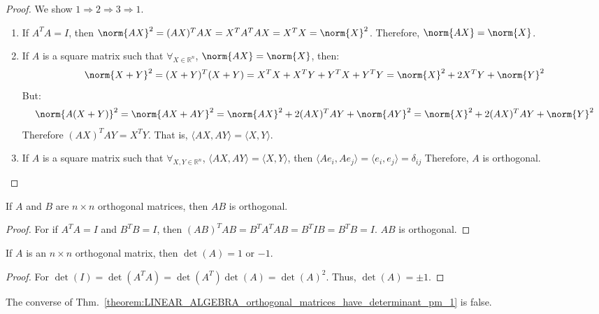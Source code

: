 \documentclass[crop=false,class=book,oneside]{standalone}
\begin{document}
        \begin{proof}
        We show $1\Rightarrow 2 \Rightarrow 3 \Rightarrow 1$.
        \begin{enumerate}
            \item If $A^TA = I$, then $\norm{AX}^{2}=(AX)^{T}AX=X^{T}A^{T}AX=X^{T}X=\norm{X}^{2}$. Therefore, $\norm{AX}=\norm{X}$.
            \item If $A$ is a square matrix such that $\forall_{X\in\mathbb{R}^{n}}$, $\norm{AX} = \norm{X}$, then:
            \begin{equation*}
                \norm{X+Y}^{2}=(X+Y)^T(X+Y)=X^TX+X^TY+Y^TX+Y^TY=\norm{X}^2+2X^TY+\norm{Y}^2
            \end{equation*}
            But:
            \begin{equation*}
                \norm{A(X+Y)}^{2}=\norm{AX+AY}^{2}=\norm{AX}^{2}+2(AX)^{T}AY+\norm{AY}^2=\norm{X}^{2}+2(AX)^{T}AY+\norm{Y}^2
            \end{equation*}
            Therefore $(AX)^TAY = X^TY$. That is, $\langle AX, AY\rangle = \langle X, Y\rangle$.
            \item If $A$ is a square matrix such that $\forall_{X,Y\in \mathbb{R}^n}$, $\langle AX, AY\rangle = \langle X, Y\rangle$, then $\langle Ae_{i}, Ae_{j}\rangle=\langle e_i,e_j\rangle=\delta_{ij}$
            Therefore, $A$ is orthogonal.
        \end{enumerate}
        \end{proof}
        \begin{theorem}
        If $A$ and $B$ are $n\times n$ orthogonal matrices, then $AB$ is orthogonal.
        \end{theorem}
        \begin{proof}
        For if $A^{T}A = I$ and $B^{T}B = I$, then $(AB)^{T}AB = B^{T}A^{T}AB = B^{T}IB = B^{T}B = I$. $AB$ is orthogonal.
        \end{proof}
        \begin{theorem}
        \label{theorem:LINEAR_ALGEBRA_orthogonal_matrices_have_determinant_pm_1}
        If $A$ is an $n\times n$ orthogonal matrix, then $\det(A) = 1$ or $-1$.
        \end{theorem}
        \begin{proof}
        For $\det(I) = \det(A^TA) = \det(A^T)\det(A) = \det(A)^2$. Thus, $\det(A) = \pm 1$.
        \end{proof}
        \begin{remark}
        The converse of Thm.~\ref{theorem:LINEAR_ALGEBRA_orthogonal_matrices_have_determinant_pm_1} is false.
        \end{remark}
\end{document}
